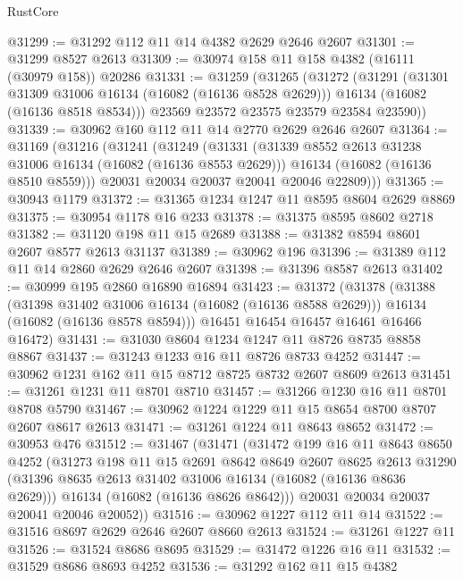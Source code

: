 \begin{lexlean}{RustCore}
\begin{coremodule}
@31299 := @31292 @112 @11 @14 @4382 @2629 @2646 @2607
@31301 := @31299 @8527 @2613
@31309 := @30974 @158 @11 @158 @4382 (@16111 (@30979 @158)) @20286
@31331 := @31259
    (@31265
      (@31272
        (@31291
          (@31301 @31309 @31006 @16134 (@16082 (@16136 @8528 @2629)))
          @16134
          (@16082 (@16136 @8518 @8534)))
        @23569
        @23572
        @23575
        @23579
        @23584
        @23590))
@31339 := @30962 @160 @112 @11 @14 @2770 @2629 @2646 @2607
@31364 := @31169
    (@31216
      (@31241
        (@31249
          (@31331
            (@31339 @8552 @2613 @31238 @31006 @16134 (@16082 (@16136 @8553 @2629)))
            @16134
            (@16082 (@16136 @8510 @8559)))
          @20031
          @20034
          @20037
          @20041
          @20046
          @22809)))
@31365 := @30943 @1179
@31372 := @31365 @1234 @1247 @11 @8595 @8604 @2629 @8869
@31375 := @30954 @1178 @16 @233
@31378 := @31375 @8595 @8602 @2718
@31382 := @31120 @198 @11 @15 @2689
@31388 := @31382 @8594 @8601 @2607 @8577 @2613 @31137
@31389 := @30962 @196
@31396 := @31389 @112 @11 @14 @2860 @2629 @2646 @2607
@31398 := @31396 @8587 @2613
@31402 := @30999 @195 @2860 @16890 @16894
@31423 := @31372
    (@31378
      (@31388
        (@31398 @31402 @31006 @16134 (@16082 (@16136 @8588 @2629)))
        @16134
        (@16082 (@16136 @8578 @8594)))
      @16451
      @16454
      @16457
      @16461
      @16466
      @16472)
@31431 := @31030 @8604 @1234 @1247 @11 @8726 @8735 @8858 @8867
@31437 := @31243 @1233 @16 @11 @8726 @8733 @4252
@31447 := @30962 @1231 @162 @11 @15 @8712 @8725 @8732 @2607 @8609 @2613
@31451 := @31261 @1231 @11 @8701 @8710
@31457 := @31266 @1230 @16 @11 @8701 @8708 @5790
@31467 := @30962 @1224 @1229 @11 @15 @8654 @8700 @8707 @2607 @8617 @2613
@31471 := @31261 @1224 @11 @8643 @8652
@31472 := @30953 @476
@31512 := @31467
    (@31471
      (@31472
        @199
        @16
        @11
        @8643
        @8650
        @4252
        (@31273
          @198
          @11
          @15
          @2691
          @8642
          @8649
          @2607
          @8625
          @2613
          @31290
          (@31396 @8635 @2613 @31402 @31006 @16134 (@16082 (@16136 @8636 @2629)))
          @16134
          (@16082 (@16136 @8626 @8642)))
        @20031
        @20034
        @20037
        @20041
        @20046
        @20052))
@31516 := @30962 @1227 @112 @11 @14
@31522 := @31516 @8697 @2629 @2646 @2607 @8660 @2613
@31524 := @31261 @1227 @11
@31526 := @31524 @8686 @8695
@31529 := @31472 @1226 @16 @11
@31532 := @31529 @8686 @8693 @4252
@31536 := @31292 @162 @11 @15 @4382

\end{coremodule}
\end{lexlean}
